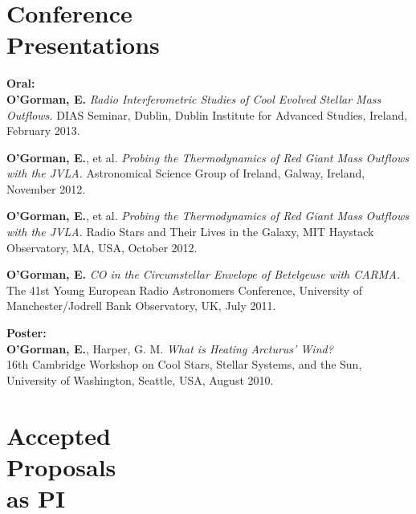 \documentclass[margin,line]{resume}
\begin{document}
\begin{resume}
    \vspace{2mm}
    \section{\mysidestyle Conference\\Presentations}

    \textbf{Oral:} \vspace{2mm}\\\vspace{1mm}%
\textbf{O'Gorman, E.} \textit{Radio Interferometric Studies of Cool Evolved Stellar Mass Outflows.}
DIAS Seminar, Dublin, Dublin Institute for Advanced Studies, Ireland, February 2013. %
    
	\textbf{O'Gorman, E.}, et al. \textit{Probing the Thermodynamics of Red Giant Mass Outflows with the JVLA.}
Astronomical Science Group of Ireland, Galway, Ireland, November 2012. %
    
\textbf{O'Gorman, E.}, et al. \textit{Probing the Thermodynamics of Red Giant Mass Outflows with the JVLA.}
Radio Stars and Their Lives in the Galaxy, MIT Haystack Observatory, MA, USA, October 2012. %

\textbf{O'Gorman, E.} \textit{CO in the Circumstellar Envelope of Betelgeuse with CARMA.}
The 41st Young European Radio Astronomers Conference, University of Manchester/Jodrell Bank Observatory, UK, July 2011.

    \textbf{Poster:} \vspace{2mm}\\\vspace{1mm}%
    \textbf{O'Gorman, E.}, Harper, G. M. \textit{What is Heating Arcturus' Wind?}\\
16th Cambridge Workshop on Cool Stars, Stellar Systems, and the Sun, University of Washington, Seattle, USA, August 2010.


    \vspace{2mm}
    \section{\mysidestyle Accepted\\Proposals\\as PI}


\end{resume}
\end{document}
